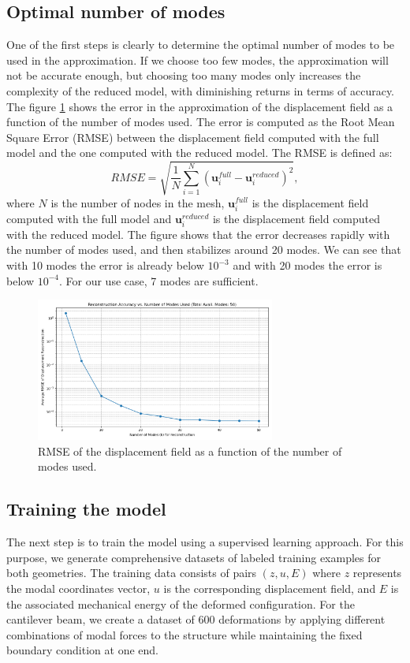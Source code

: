 \subsection{Optimal number of modes}
\label{sec:optimal_number_modes}
One of the first steps is clearly to determine the optimal number of modes to be used in the approximation. If we choose too few modes, the approximation will not be accurate enough, but choosing too many modes only increases the complexity of the reduced model, with diminishing returns in terms of accuracy. The figure \ref{fig:optimal_number_modes} shows the error in the approximation of the displacement field as a function of the number of modes used. The error is computed as the Root Mean Square Error (RMSE) between the displacement field computed with the full model and the one computed with the reduced model. The RMSE is defined as:
\begin{equation}
    RMSE = \sqrt{\frac{1}{N}\sum_{i=1}^N (\bm{u}_i^{full} - \bm{u}_i^{reduced})^2},
\end{equation}
where $N$ is the number of nodes in the mesh, $\bm{u}_i^{full}$ is the displacement field computed with the full model and $\bm{u}_i^{reduced}$ is the displacement field computed with the reduced model. The figure shows that the error decreases rapidly with the number of modes used, and then stabilizes around 20 modes. We can see that with 10 modes the error is already below \(10^{-3}\) and with 20 modes the error is below \(10^{-4}\). For our use case, 7 modes are sufficient.
\begin{figure}[H]
    \centering
    \includegraphics[width=0.7\textwidth]{Images/rmse_vs_modes.png}
    \caption{RMSE of the displacement field as a function of the number of modes used.}
    \label{fig:optimal_number_modes}
\end{figure}

\subsection{Training the model}
\label{sec:training_model}
The next step is to train the model using a supervised learning approach. For this purpose, we generate comprehensive datasets of labeled training examples for both geometries. The training data consists of pairs $(z, u, E)$ where $z$ represents the modal coordinates vector, $u$ is the corresponding displacement field, and $E$ is the associated mechanical energy of the deformed configuration.
For the cantilever beam, we create a dataset of 600 deformations by applying different combinations of modal forces to the structure while maintaining the fixed boundary condition at one end. 

